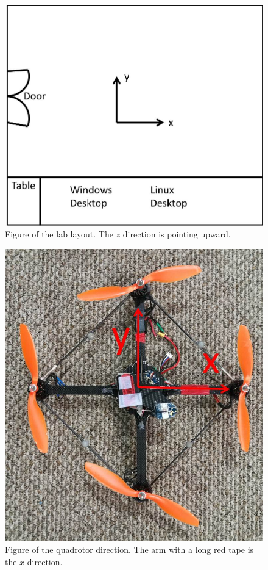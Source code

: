 \documentclass[idxtotoc,hyperref,openany]{labbook} %
\begin{document}
\begin{enumerate}
\begin{figure}[h!]
\centering
\includegraphics[scale=0.3]{./Figure/fig_lablayout}
\caption{Figure of the lab layout. The $z$ direction is pointing upward.}\label{fig_lablayout}
\end{figure}
\begin{figure}[h!]
\centering
\includegraphics[scale=0.3]{./Figure/fig_quadrotor}
\caption{Figure of the quadrotor direction. The arm with a long red tape is the $x$ direction.}\label{fig_quadrotor}
\end{figure}


\end{enumerate}
\end{document}
